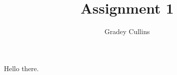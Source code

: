 \documentclass[10pt,a4paper]{article}
\author{Gradey Cullins}
\title{Assignment 1}
\begin{document}
\maketitle

\section{}
Hello there.
\end{document}

